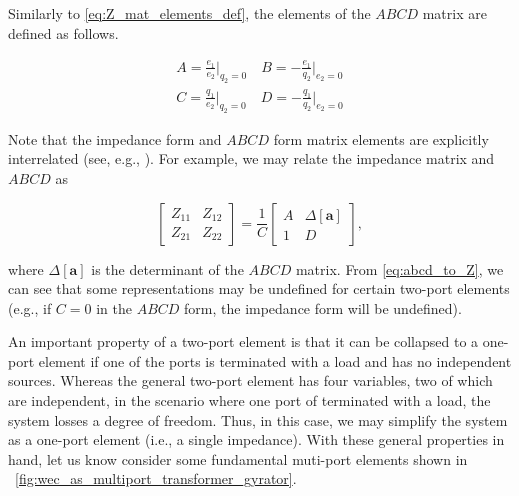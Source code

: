 \documentclass[lettersize,journal]{IEEEtran}
\begin{document}
\noindent{}Similarly to \eqref{eq:Z_mat_elements_def}, the elements of the $ABCD$ matrix are defined as follows.

\begin{subequations} \label{eq:abcd_mat_elements_def}
        \begin{align}
                A = \frac{e_1}{e_2} \bigg \vert_{q_2=0}  \quad
                B = - \frac{e_1}{q_2} \bigg \vert_{e_2=0}  \\[1em]
                C = \frac{q_1}{e_2} \bigg \vert_{q_2=0}  \quad
                D = - \frac{q_1}{q_2} \bigg \vert_{e_2=0} 
        \end{align}
\end{subequations}

\noindent{}Note that the impedance form and $ABCD$ form matrix elements are explicitly interrelated (see, e.g., \cite{Frickey:1994aa}).
For example, we may relate the impedance matrix and $ABCD$ as

\begin{equation}
        \begin{bmatrix}
                Z_{11} & Z_{12} \\ Z_{21} & Z_{22}
        \end{bmatrix}
        =
        \frac{1}{C}
        \begin{bmatrix}
                A & \Delta \left[ \mathbf{a} \right] \\ 1 & D
        \end{bmatrix} ,
\label{eq:abcd_to_Z}
\end{equation}

\noindent{}where $\Delta \left[ \mathbf{a} \right]$ is the determinant of the $ABCD$ matrix.
From \eqref{eq:abcd_to_Z}, we can see that some representations may be undefined for certain two-port elements (e.g., if $C=0$ in the $ABCD$ form, the impedance form will be undefined).

An important property of a two-port element is that it can be collapsed to a one-port element if one of the ports is terminated with a load and has no independent sources.
Whereas the general two-port element has four variables, two of which are independent, in the scenario where one port of terminated with a load, the system losses a degree of freedom.
Thus, in this case, we may simplify the system as a one-port element (i.e., a single impedance).
With these general properties in hand, let us know consider some fundamental muti-port elements shown in \figurename~\ref{fig:wec_as_multiport_transformer_gyrator}.
\end{document}
